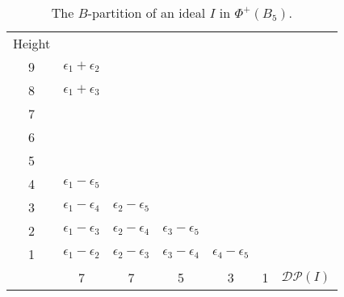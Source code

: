 \documentclass[12pt]{amsart}
\theoremstyle{plain}
\theoremstyle{definition}
\theoremstyle{remark}
\newcommand{\DP}{{\mathcal{DP}}}
\begin{document}
\begin{table}[htbp]
\centering
{\footnotesize\renewcommand{} 
\begin{tabular}{ccccccc}
\mbox{Height} & & & && \\
9 &   $\epsilon_1+\epsilon_2$ &   &  & && \\
8 &  $\epsilon_1+\epsilon_3$ &   & & &&\\
\hhline{~--}
7 & \multicolumn{1}{|c}{\cellcolor{blue!25}{$\epsilon_1+\epsilon_4$}} & \multicolumn{1}{c|}{\cellcolor{blue!25}{$\epsilon_2+\epsilon_3$}}  & && \\
6 & \multicolumn{1}{|c}{\cellcolor{blue!25}{$\epsilon_1+\epsilon_5$}} & \multicolumn{1}{c|}{\cellcolor{blue!25}{$\epsilon_2+\epsilon_4$}}  & && \\
\cline{4-4}
5 & \multicolumn{1}{|c}{\cellcolor{red!25}{$\epsilon_1$}} & \cellcolor{blue!25}{$\epsilon_2+\epsilon_5$} &\multicolumn{1}{c|}{\cellcolor{blue!25}{$\epsilon_3 +\epsilon_4$}} &&& \\
4& \multicolumn{1}{|c}{\cellcolor{yellow!25}$\epsilon_1-\epsilon_5$} & \cellcolor{red!25}{$\epsilon_2$} & \multicolumn{1}{c|}{\cellcolor{blue!25}{$\epsilon_3 +\epsilon_5$}} &&&\\
\cline{5-5}
3 & \multicolumn{1}{|c}{\cellcolor{yellow!25}$\epsilon_1-\epsilon_4$} & \cellcolor{yellow!25}$\epsilon_2-\epsilon_5$ & \cellcolor{red!25}{$\epsilon_3$} &  \multicolumn{1}{c|}{\cellcolor{blue!25}{$\epsilon_4+\epsilon_5$}} &&\\
2& \multicolumn{1}{|c}{\cellcolor{yellow!25}$\epsilon_1-\epsilon_3$} & \cellcolor{yellow!25}$\epsilon_2-\epsilon_4$ & \cellcolor{yellow!25}$\epsilon_3-\epsilon_5$ & \multicolumn{1}{c|}{\cellcolor{red!25}{$\epsilon_4$}} &&\\
\cline{6-6}
1 & \multicolumn{1}{|c}{\cellcolor{yellow!25}$\epsilon_1-\epsilon_2$} & \cellcolor{yellow!25}$\epsilon_2 -\epsilon_3$& \cellcolor{yellow!25}$\epsilon_3-\epsilon_4$  & \cellcolor{yellow!25}$\epsilon_4-\epsilon_5$ & \multicolumn{1}{c|}{\cellcolor{red!25}{$\epsilon_5$}} &\\
\cline{2-6}
& 7 & 7 & 5 & 3  & 1 & $\DP(I)$
\end{tabular}
}
\bigskip
\caption{The $B$-partition of an ideal $I$ in $\Phi^+(B_5)$.}
\label{tab:B5-Bpartition}
\end{table}
\end{document}
